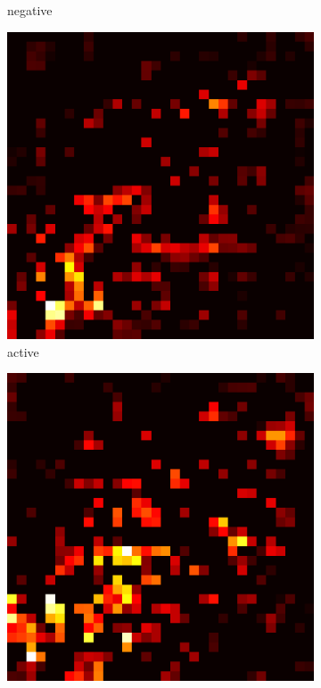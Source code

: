\documentclass[preprint,12pt]{elsarticle}
\begin{document}
\begin{figure}
\begin{subfigure}{0.14\textwidth}
        \caption{negative}
    \end{subfigure}
    \hfill
    \begin{subfigure}{0.14\textwidth}
        \centering
        \includegraphics[width=\linewidth]{../visualizations/examples/cifar10/cnn/active_saliency_map/3.png}
        \caption{active}
    \end{subfigure}
    \hfill
    \begin{subfigure}{0.14\textwidth}
        \centering
        \includegraphics[width=\linewidth]{../visualizations/examples/cifar10/cnn/inactive_saliency_map/3.png}

\end{subfigure}
\end{figure}
\end{document}
